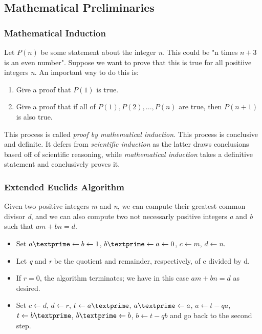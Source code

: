 \documentclass{article}
\begin{document}
	\subsection{Mathematical Preliminaries}
	\subsubsection{Mathematical Induction}
	Let $P(n)$ be some statement about the integer \textit{n}. This could be "n times $n+3$ is an even number". Suppose we want to prove that this is true for all positiive integers \textit{n}. An important way to do this is:
	\begin{enumerate}
		\item Give a proof that $P(1)$ is true.
		\item Give a proof that if all of $P(1), P(2), ... , P(n)$ are true, then $P(n+1)$ is also true.
	\end{enumerate}
	This process is called \textit{proof by mathematical induction}. This process is conclusive and definite. It defers from \textit{scientific induction} as the latter draws conclusions based off of scientific reasoning, while \textit{mathematical induction} takes a definitive statement and conclusively proves it.
	\subsubsection{Extended Euclids Algorithm}
	Given two positive integers \textit{m} and \textit{n}, we can compute their greatest common divisor \textit{d}, and we can also compute two not necessarly positive integers \textit{a} and \textit{b} such that $am + bn = d$.
	\begin{itemize}
		\item Set $a\textprime \leftarrow b \leftarrow 1$, $b\textprime \leftarrow a \leftarrow 0$, $c \leftarrow m$, $d \leftarrow n$.
		\item Let \textit{q} and \textit{r} be the quotient and remainder, respectively, of c divided by d.
		\item If $r = 0$, the algorithm terminates; we have in this case $am + bn = d$ as desired.
		\item Set $c \leftarrow d$, $d \leftarrow r$, $t \leftarrow a\textprime$, $a\textprime \leftarrow a$, $a \leftarrow t - qa$, $t \leftarrow b\textprime$, $b\textprime \leftarrow b$, $b \leftarrow t - qb$ and go back to the second step.
	\end{itemize}
	
\end{document}
